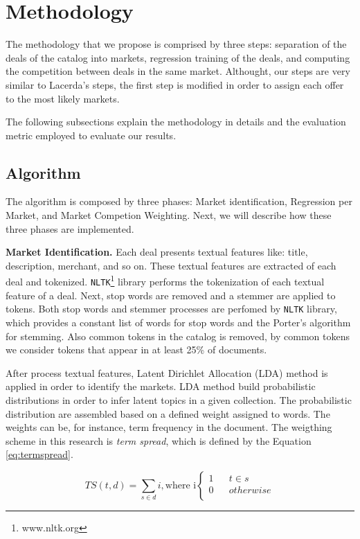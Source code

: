 \documentclass{acm_proc_article-sp}
\begin{document}
\section{Methodology}

The methodology that we propose is comprised by three steps: 
separation of the deals of the catalog into markets, regression training 
of the deals, and computing the competition between deals in the same 
market. Althought, our steps are very similar to Lacerda's steps, 
the first step is modified in order to assign each offer to the 
most likely markets.

The following subsections explain the methodology in details and 
the evaluation metric employed to evaluate our results.

\subsection{Algorithm}

The algorithm is composed by three phases: Market identification, 
Regression per Market, and Market Competion Weighting. Next, we will 
describe how these three phases are implemented.

\textbf{Market Identification.} Each deal presents textual features 
like: title, description, 
merchant, and so on. These textual features are extracted 
of each deal and tokenized. \texttt{NLTK}\footnote{www.nltk.org} library 
performs the tokenization of each textual feature of a deal. 
Next, stop words are removed and a stemmer are applied to tokens. 
Both stop words and stemmer processes are perfomed by 
\texttt{NLTK} library, which provides a constant list of words 
for stop words and the Porter's algorithm for stemming.
Also common tokens in the catalog is removed, by common tokens 
we consider tokens that appear in at least 25\%  of documents.

After process textual features,
Latent Dirichlet Allocation (LDA) 
method is applied in order to identify the markets. LDA method 
build probabilistic distributions in order to infer latent topics 
in a given collection. The probabilistic distribution are assembled
based on a defined weight assigned to words. The weights can be, 
for instance, term frequency in 
the document. The weigthing scheme in this research is 
\emph{term spread}, which is defined by the Equation 
\ref{eq:termspread}.

\begin{equation}
    TS(t,d) = \sum_{s \in d} i, \text{where i} \left\{ \begin{aligned} 
    1 & & t \in s \\
    0 & & otherwise \\
    \end{aligned} \right.
    \label{eq:termspread}
\end{equation}
\end{document}
